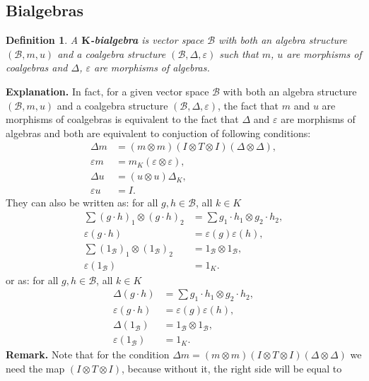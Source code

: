 \documentclass[a4paper, 12pt]{article}
\newtheorem{definition}{Definition}
\begin{document}
\subsection{Bialgebras}
\begin{definition}
A \textbf{$\textbf{K}$-bialgebra} is vector space $\mathcal{B}$ with both an algebra structure
$(\mathcal{B}, m, u)$ and a coalgebra structure $(\mathcal{B}, \Delta, \varepsilon)$ such that $m$, $u$
are morphisms of coalgebras and $\Delta$, $\varepsilon$ are morphisms of algebras.
\end{definition}
\textbf{Explanation. } In fact, for a given vector space $\mathcal{B}$ with both an algebra structure
$(\mathcal{B}, m, u)$ and a coalgebra structure $(\mathcal{B}, \Delta, \varepsilon)$, the fact that
$m$ and $u$ are morphisms of coalgebras is equivalent to the fact that $\Delta$ and $\varepsilon$ are
morphisms of
algebras and both are equivalent to conjuction of following conditions:
\begin{align*}
\Delta m &= (m\otimes m)(I \otimes T \otimes I)(\Delta \otimes \Delta), \\
\varepsilon m &= m_K(\varepsilon \otimes \varepsilon), \\
\Delta u &= (u \otimes u)\Delta_K, \\
\varepsilon u &= I.
\end{align*}
They can also be written as: for all $g, h \in \mathcal{B}$, all $k \in K$
\begin{align*}
\sum (g \cdot h)_1 \otimes (g \cdot h)_2 &= \sum g_1 \cdot h_1 \otimes g_2 \cdot h_2, \\
\varepsilon(g \cdot h) &= \varepsilon(g)\varepsilon(h), \\
\sum (1_\mathcal{B})_1 \otimes (1_\mathcal{B})_2 &= 1_\mathcal{B} \otimes 1_\mathcal{B}, \\
\varepsilon (1_\mathcal{B}) &= 1_K.
\end{align*}
or as: for all $g, h \in \mathcal{B}$, all $k \in K$
\begin{align*}
\Delta(g \cdot h) &= \sum g_1 \cdot h_1 \otimes g_2 \cdot h_2, \\
\varepsilon(g \cdot h) &= \varepsilon(g)\varepsilon(h), \\
\Delta (1_\mathcal{B}) &= 1_\mathcal{B} \otimes 1_\mathcal{B}, \\
\varepsilon (1_\mathcal{B}) &= 1_K.
\end{align*}
\textbf{Remark. } Note that for the condition
$\Delta m = (m\otimes m)(I \otimes T \otimes I)(\Delta \otimes \Delta)$
we need the map $(I \otimes T \otimes I)$, because without it, the right side will be equal to
\end{document}
